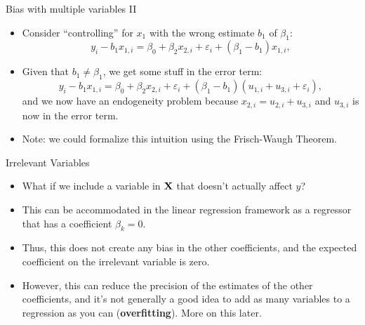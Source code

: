 \begin{frame}{Bias with multiple variables II}
\begin{itemize}
		\item Consider ``controlling'' for $x_1$ with the wrong estimate $b_1$ of $\beta_1$:\[
					y_i - b_1 x_{1,i} = \beta_0 + \beta_2 x_{2,i}  + \varepsilon_i + (\beta_1 - b_1) x_{1,i},
\]

\medskip
		\item Given that $b_1 \ne \beta_1$, we get some stuff in the error term:\[
					y_i - b_1 x_{1,i} = \beta_0 + \beta_2 x_{2,i}  + \varepsilon_i + (\beta_1 - b_1) (u_{1,i} + u_{3,i} + \varepsilon_i),
\]
and we now have an endogeneity problem because $x_{2,i} = u_{2,i} + u_{3,i}$ and $u_{3,i}$ is now in the error term.

\medskip
\item Note: we could formalize this intuition using the Frisch-Waugh Theorem. 
\end{itemize}
\end{frame}


\begin{frame}{Irrelevant Variables}
\begin{itemize}
	\item What if we include a variable in ${\bf X}$ that doesn't actually
	affect $y$?

	\smallskip
	\item This can be accommodated in the linear regression framework as
	a regressor that has a coefficient $\beta_{k}=0$.

	\smallskip
	\item Thus, this does not create any bias in the other coefficients, and the 
	expected coefficient on the irrelevant variable is zero.

	\smallskip
	\item However, this can reduce the precision of the estimates of the 
	other coefficients, and it's not generally a good idea to add as many variables
	to a regression as you can ({\bf overfitting}). More on this later. 

	
\end{itemize}
\end{frame}




